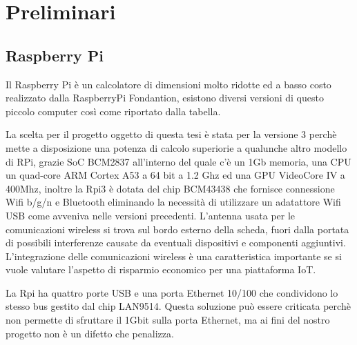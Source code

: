 \chapter{Preliminari}

\ifpdf
    \graphicspath{{Chapter2/Figs/Raster/}{Chapter2/Figs/PDF/}{Chapter2/Figs/}}
\else
    \graphicspath{{Chapter2/Figs/Vector/}{Chapter2/Figs/}}
\fi


\section{Raspberry Pi}
Il Raspberry Pi è un calcolatore di  dimensioni molto ridotte ed a basso costo realizzato dalla RaspberryPi Fondantion, esistono diversi versioni di questo piccolo computer  così come riportato dalla tabella.



La scelta per il progetto oggetto di questa tesi è stata per la versione 3  perchè mette a disposizione una potenza di calcolo superiorie a qualunche altro modello di RPi, grazie SoC BCM2837 all'interno del quale c'è  un 1Gb memoria, una CPU un quad-core ARM Cortex A53 a 64 bit a 1.2 Ghz ed una GPU VideoCore IV a 400Mhz, inoltre la Rpi3 è dotata del chip BCM43438 che fornisce connessione Wifi b/g/n e Bluetooth eliminando la necessità di utilizzare  un adatattore Wifi USB come avveniva nelle versioni precedenti.
L'antenna usata per le comunicazioni wireless si  trova sul bordo esterno della scheda, fuori dalla portata di possibili interferenze causate  da eventuali dispositivi e componenti aggiuntivi. L'integrazione delle comunicazioni wireless è una caratteristica importante se si vuole valutare l'aspetto di risparmio economico per una piattaforma IoT.

La Rpi ha quattro porte USB e una porta Ethernet 10/100 che condividono lo stesso bus gestito dal chip LAN9514. Questa soluzione può essere criticata  perchè non permette di sfruttare il 1Gbit sulla porta Ethernet, ma ai fini del nostro progetto non è un difetto che penalizza.


